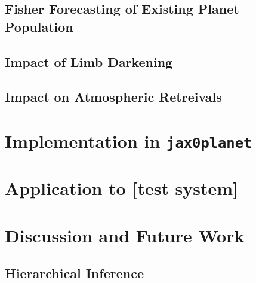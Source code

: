 \documentclass[twocolumn]{aastex631}
\begin{document}
\subsection{Fisher Forecasting of Existing Planet Population}
\label{sec:fisherforecasting}
\subsection{Impact of Limb Darkening}
\subsection{Impact on Atmospheric Retreivals}
\section{Implementation in \lowercase{\texttt{jax0planet}}}
\label{sec:jax0planet}
\section{Application to [test system]}
\label{sec:lctest}
\section{Discussion and Future Work}
\label{disc}
\subsection{Hierarchical Inference}

\end{document}
